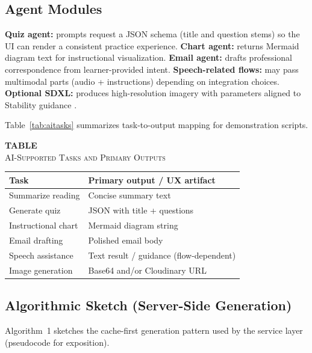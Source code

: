 \documentclass[conference]{IEEEtran}
\newcommand{\tabcap}[2]{%
  \par\addvspace{2pt}%
  \refstepcounter{table}\label{#1}%
  {\centering\footnotesize\textbf{TABLE~\Roman{table}}\\%
  \textsc{#2}\par}%
  \addvspace{2pt}%
}
\begin{document}
\subsection{Agent Modules}

\textbf{Quiz agent:} prompts request a JSON schema (title and question stems) so the UI can render a consistent practice experience. \textbf{Chart agent:} returns Mermaid diagram text for instructional visualization. \textbf{Email agent:} drafts professional correspondence from learner-provided intent. \textbf{Speech-related flows:} may pass multimodal parts (audio + instructions) depending on integration choices. \textbf{Optional SDXL:} produces high-resolution imagery with parameters aligned to Stability guidance \cite{b7}.

Table~\ref{tab:aitasks} summarizes task-to-output mapping for demonstration scripts.

\begin{center}
\tabcap{tab:aitasks}{AI-Supported Tasks and Primary Outputs}
\renewcommand{\arraystretch}{1.12}
\footnotesize
\begin{tabular}{|p{2.5cm}|p{5.1cm}|}
\hline
\textbf{Task} & \textbf{Primary output / UX artifact} \\
\hline
Summarize reading & Concise summary text \\
\hline
Generate quiz & JSON with title + questions \\
\hline
Instructional chart & Mermaid diagram string \\
\hline
Email drafting & Polished email body \\
\hline
Speech assistance & Text result / guidance (flow-dependent) \\
\hline
Image generation & Base64 and/or Cloudinary URL \\
\hline
\end{tabular}
\end{center}

\subsection{Algorithmic Sketch (Server-Side Generation)}

Algorithm~1 sketches the cache-first generation pattern used by the service layer (pseudocode for exposition).
\end{document}
